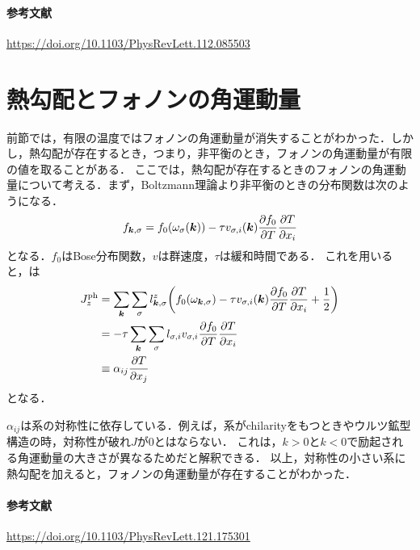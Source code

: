 \documentclass{report}
\begin{document}
\paragraph*{参考文献}
\url{https://doi.org/10.1103/PhysRevLett.112.085503}

\section{熱勾配とフォノンの角運動量}
前節では，有限の温度ではフォノンの角運動量が消失することがわかった．しかし，熱勾配が存在するとき，つまり，非平衡のとき，フォノンの角運動量が有限の値を取ることがある．
ここでは，熱勾配が存在するときのフォノンの角運動量について考える．まず，Boltzmann理論より非平衡のときの分布関数は次のようになる．
\begin{align}
  f_{\bm{k},\sigma} = f_0(\omega_\sigma(\bm{k})) - \tau v_{\sigma,i}(\bm{k}) \pdv{f_0}{T}\pdv{T}{x_i} \label{distribution}
\end{align}
となる．$f_0$はBose分布関数，$v$は群速度，$\tau$は緩和時間である．
これを用いると，は
\begin{align}
  J_z^{\mathrm{ph}} &= \sum_{\bm{k}}\sum_{\sigma} l_{\bm{k},\sigma}^z \qty(f_0(\omega_{\bm{k},\sigma}) - \tau v_{\sigma,i}(\bm{k}) \pdv{f_0}{T}\pdv{T}{x_i} + \frac{1}{2}) \\
  &= -\tau \sum_{\bm{k}}\sum_{\sigma} l_{\sigma,i} v_{\sigma,i} \pdv{f_0}{T}\pdv{T}{x_i}\\
  &\equiv \alpha_{ij}\pdv{T}{x_j}
\end{align}
となる．

$\alpha_{ij}$は系の対称性に依存している．例えば，系がchilarityをもつときやウルツ鉱型構造の時，対称性が破れ$J$が0とはならない．
これは，$k>0$と$k<0$で励起される角運動量の大きさが異なるためだと解釈できる．
以上，対称性の小さい系に熱勾配を加えると，フォノンの角運動量が存在することがわかった．
\paragraph*{参考文献}
\url{https://doi.org/10.1103/PhysRevLett.121.175301}
\end{document}
